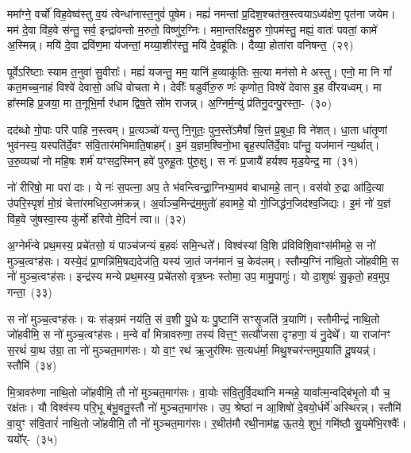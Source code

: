ममा᳚ग्ने॒ वर्चो॑ विह॒वेष्व॑स्तु व॒यं त्वेन्धा॑नास्त॒नुवं॑ पुषेम। मह्यं॑ नमन्तां प्र॒दिश॒श्चत॑स्र॒स्त्वया\-ऽ\-ध्य॑क्षेण॒ पृत॑ना जयेम। मम॑ दे॒वा वि॑ह॒वे स॑न्तु॒ सर्व॒ इन्द्रा॑वन्तो म॒रुतो॒ विष्णु॑र॒ग्निः। ममा॒न्तरि॑क्षमु॒रु गो॒पम॑स्तु॒ मह्यं॒ वातः॑ पवतां॒ कामे॑ अ॒स्मिन्न्। मयि॑ दे॒वा द्रवि॑ण॒मा य॑जन्तां॒ मय्या॒शीर॑स्तु॒ मयि॑ दे॒वहू॑तिः। दैव्या॒ होता॑रा वनिषन्त॒~(२९)\ip

पूर्वे\-ऽरि॑ष्टाः स्याम त॒नुवा॑ सु॒वीराः᳚। मह्यं॑ यजन्तु॒ मम॒ यानि॑ ह॒व्याकू॑तिः स॒त्या मन॑सो मे अस्तु। एनो॒ मा नि गां᳚ कत॒मच्च॒नाहं विश्वे॑ देवासो॒ अधि॑ वोचता मे। देवीः᳚ षडुर्वीरु॒रु णः॑ कृणोत॒ विश्वे॑ देवास इ॒ह वी॑रयध्वम्। मा हा᳚स्महि प्र॒जया॒ मा त॒नूभि॒र्मा र॑धाम द्विष॒ते सो॑म राजन्न्। अ॒ग्निर्म॒न्युं प्र॑तिनु॒दन्पु॒रस्ता॒-~(३०)\ip

दद॑ब्धो गो॒पाः परि॑ पाहि न॒स्त्वम्। प्र॒त्यञ्चो॑ यन्तु नि॒गुतः॒ पुन॒स्ते॑\-ऽमैषां᳚ चि॒त्तं प्र॒बुधा॒ वि ने॑शत्। धा॒ता धा॑तृ॒णां भुव॑नस्य॒ यस्पति॑र्दे॒वꣳ स॑वि॒तार॑मभिमाति॒षाहम्᳚। इ॒मं य॒ज्ञम॒श्विनो॒भा बृह॒स्पति॑र्दे॒वाः पा᳚न्तु॒ यज॑मानं न्य॒र्थात्। उ॒रु॒व्यचा॑ नो महि॒षः शर्म॑ यꣳसद॒स्मिन् हवे॑ पुरुहू॒तः पु॑रु॒क्षु। स नः॑ प्र॒जायै॑ हर्यश्व मृड॒येन्द्र॒ मा~(३१)\ip

नो॑ रीरिषो॒ मा परा॑ दाः। ये नः॑ स॒पत्ना॒ अप॒ ते भ॑वन्त्विन्द्रा॒ग्निभ्या॒मव॑ बाधामहे॒ तान्। वस॑वो रु॒द्रा आ॑दि॒त्या उ॑परि॒स्पृशं॑ मो॒ग्रं चेत्ता॑रमधिरा॒जम॑क्रन्न्। अ॒र्वाञ्च॒मिन्द्र॑म॒मुतो॑ हवामहे॒ यो गो॒जिद्ध॑न॒जिद॑श्व॒जिद्यः। इ॒मं नो॑ य॒ज्ञं वि॑ह॒वे जु॑षस्वा॒स्य कु॑र्मो हरिवो मे॒दिनं॑ त्वा॥~(३२)\ip

{\anuvakamend[{व॒नि॒ष॒न्त॒ पु॒रस्ता॒न्मा त्रिच॑त्वारिꣳशच्च}]}%

अ॒ग्नेर्म॑न्वे प्रथ॒मस्य॒ प्रचे॑तसो॒ यं पाञ्च॑जन्यं ब॒हवः॑ समि॒न्धते᳚। विश्व॑स्यां वि॒शि प्र॑विविशि॒वाꣳस॑मीमहे॒ स नो॑ मुञ्च॒त्वꣳह॑सः। यस्ये॒दं प्रा॒णन्नि॑मि॒षद्यदेज॑ति॒ यस्य॑ जा॒तं जन॑मानं च॒ केव॑लम्। स्तौम्य॒ग्निं ना॑थि॒तो जो॑हवीमि॒ स नो॑ मुञ्च॒त्वꣳह॑सः। इन्द्र॑स्य मन्ये प्रथ॒मस्य॒ प्रचे॑तसो वृत्र॒घ्नः स्तोमा॒ उप॒ मामु॒पागुः॑। यो दा॒शुषः॑ सु॒कृतो॒ हव॒मुप॒ गन्ता॒~(३३)\ip

स नो॑ मुञ्च॒त्वꣳह॑सः। यः स॑ङ्ग्रमं नय॑ति॒ सं व॒शी यु॒धे यः पु॒ष्टानि॑ सꣳसृ॒जति॑ त्र॒याणि॑। स्तौमीन्द्रं॑ नाथि॒तो जो॑हवीमि॒ स नो॑ मुञ्च॒त्वꣳह॑सः। म॒न्वे वां᳚ मित्रावरुणा॒ तस्य॑ वित्त॒ꣳ॒ सत्यौ॑जसा दृꣳहणा॒ यं नु॒देथे᳚। या राजा॑नꣳ स॒रथं॑ या॒थ उ॑ग्रा॒ ता नो॑ मुञ्चत॒माग॑सः। यो वा॒ꣳ॒ रथ॑ ऋ॒जुर॑श्मिः स॒त्यध॑र्मा॒ मिथु॒श्चर॑न्तमुप॒याति॑ दू॒षयन्न्॑। स्तौमि॑~(३४)\ip

मि॒त्रावरु॑णा नाथि॒तो जो॑हवीमि॒ तौ नो॑ मुञ्चत॒माग॑सः। वा॒योः स॑वि॒तुर्वि॒दथा॑नि मन्महे॒ यावा᳚त्म॒न्वद्बि॑भृ॒तो यौ च॒ रक्ष॑तः। यौ विश्व॑स्य परि॒भू ब॑भू॒वतु॒स्तौ नो॑ मुञ्चत॒माग॑सः। उप॒ श्रेष्ठा॑ न आ॒शिषो॑ दे॒वयो॒र्धर्मे॑ अस्थिरन्न्। स्तौमि॑ वा॒युꣳ स॑वि॒तारं॑ नाथि॒तो जो॑हवीमि॒ तौ नो॑ मुञ्चत॒माग॑सः। र॒थीत॑मौ रथी॒नाम॑ह्व ऊ॒तये॒ शुभं॒ गमि॑ष्ठौ सु॒यमे॑भि॒रश्वैः᳚। ययो᳚र्-~(३५)\ip

